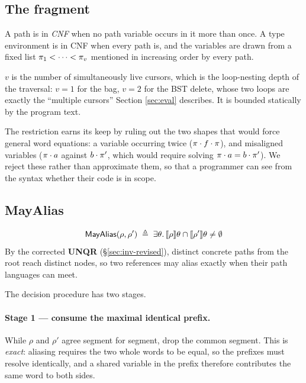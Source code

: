 \subsection{The fragment}
\label{sec:pathfrag-def}

\begin{definition}
\label{def:cnf}
A path is in \emph{CNF} when no path variable occurs in it more than once.  A
type environment is in CNF when every path is, and the variables are drawn from a
fixed list $\pi_1 < \cdots < \pi_v$ mentioned in increasing order by every
path.
\end{definition}

$v$ is the number of simultaneously live cursors, which is the loop-nesting depth
of the traversal: $v = 1$ for the bag, $v = 2$ for the BST delete, whose two
loops are exactly the ``multiple cursors'' Section \ref{sec:eval} describes.  It
is bounded statically by the program text.

The restriction earns its keep by ruling out the two shapes that would force
general word equations: a variable occurring twice ($\pi \cdot f \cdot \pi$),
and misaligned variables ($\pi \cdot a$ against $b \cdot \pi'$, which would
require solving $\pi \cdot a = b \cdot \pi'$).  We reject these rather than
approximate them, so that a programmer can see from the syntax whether their code
is in scope.

\subsection{MayAlias}
\label{sec:pathfrag-alias}

\[
\textsf{MayAlias}(\rho,\rho') \;\triangleq\;
  \exists\theta \ldotp \llbracket \rho \rrbracket\theta \cap \llbracket \rho' \rrbracket\theta \neq \emptyset
\]
By the corrected \textbf{UNQR} (\S\ref{sec:inv-revised}), distinct concrete paths
from the root reach distinct nodes, so two references may alias exactly when
their path languages can meet.

The decision procedure has two stages.

\paragraph{Stage 1 --- consume the maximal identical prefix.}
While $\rho$ and $\rho'$ agree segment for segment, drop the common segment.
This is \emph{exact}: aliasing requires the two whole words to be equal, so the
prefixes must resolve identically, and a shared variable in the prefix therefore
contributes the same word to both sides.

